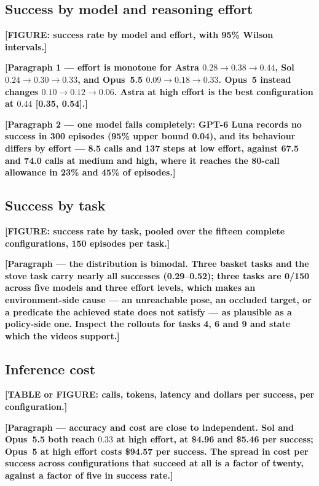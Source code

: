 \documentclass[11pt]{article}
\newcommand{\placeholder}[1]{\textbf{[#1]}}
\begin{document}
\subsection{Success by model and reasoning effort}
\label{sec:res:models}
\placeholder{FIGURE: success rate by model and effort, with 95\% Wilson
intervals.}

\placeholder{Paragraph 1 --- effort is monotone for Astra
$0.28\to0.38\to0.44$, Sol $0.24\to0.30\to0.33$, and Opus~5.5
$0.09\to0.18\to0.33$. Opus~5 instead changes $0.10\to0.12\to0.06$.
Astra at high effort is the best configuration at $0.44$ [0.35, 0.54].}

\placeholder{Paragraph 2 --- one model fails completely: GPT-6 Luna records no
success in 300 episodes (95\% upper bound 0.04), and its behaviour differs by
effort --- 8.5 calls and 137 steps at low effort, against 67.5 and 74.0 calls
at medium and high, where it reaches the 80-call allowance in 23\% and 45\% of
episodes.}

\subsection{Success by task}
\label{sec:res:tasks}
\placeholder{FIGURE: success rate by task, pooled over the fifteen complete
configurations, 150 episodes per task.}

\placeholder{Paragraph --- the distribution is bimodal. Three basket tasks and
the stove task carry nearly all successes (0.29--0.52); three tasks are 0/150
across five models and three effort levels, which makes an environment-side
cause --- an unreachable pose, an occluded target, or a predicate the achieved
state does not satisfy --- as plausible as a policy-side one. Inspect the
rollouts for tasks 4, 6 and 9 and state which the videos support.}

\subsection{Inference cost}
\label{sec:res:cost}
\placeholder{TABLE or FIGURE: calls, tokens, latency and dollars per success,
per configuration.}

\placeholder{Paragraph --- accuracy and cost are close to independent. Sol and
Opus~5.5 both reach $0.33$ at high effort, at \$4.96 and \$5.46 per success;
Opus~5 at high effort costs \$94.57 per success. The spread in cost per success
across configurations that succeed at all is a factor of twenty, against a
factor of five in success rate.}
\end{document}
